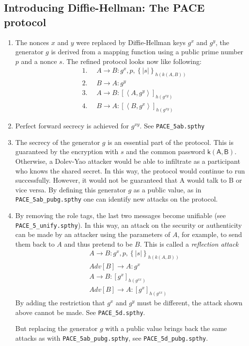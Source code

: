 \documentclass[a4paper,11pt]{scrartcl}
\newcommand{\tuple}[1]{\left\langle #1\right\rangle}
\begin{document}
\subsection{Introducing Diffie-Hellman: The PACE protocol}
\begin{enumerate}[label=\alph*)]
	\item The nonces $x$ and $y$ were replaced by Diffie-Hellman keys $g^x$ and $g^y$, the generator $g$ is derived from a mapping function using a public prime number $p$ and a nonce $s$.
The refined protocol looks now like following:
	  \begin{align*}
    		&\text{1. }\quad A \rightarrow B: g^x, p, \left\lbrace | s | \right\rbrace_{h(k(A,  B))}\\
		&\text{2. }\quad B \rightarrow A: g^y\\
		&\text{3. }\quad A \rightarrow B: [\tuple{A,  g^y}]_{h(g^{xy})}\\
		&\text{4. }\quad B \rightarrow A: [\tuple{B,  g^x}]_{h(g^{xy})}
  	\end{align*}
	\item Perfect forward secrecy is achieved for $g^{xy}$.  \newline
	See \texttt{PACE\_5ab.spthy}
	\item The secrecy of the generator $g$ is an essential part of the protocol. This is guaranteed by the encryption with $s$ and the common password $\mathsf{k(A,B)}$.  Otherwise, a Dolev-Yao attacker would be able to infiltrate as a participant who knows the shared secret.  In this way, the protocol would continue to run successfully. However, it would not be guaranteed that A would talk to B or vice versa.  By defining this generator $g$ as a public value, as in \texttt{PACE\_5ab\_pubg.spthy} one can identify new attacks on the protocol.
	\item By removing the role tags, the last two messages become unifiable (see \texttt{PACE\_5\_unify.spthy}).  In this way,  an attack on the security or authenticity can be made by an attacker using the parameters of $A$,  for example, to send them back to $A$ and thus pretend to be $B$. This is called a \emph{reflection attack}
	\begin{align*}
    		&A \rightarrow B: g^x, p, \left\lbrace | s | \right\rbrace_{h(k(A,  B))}\\
		&Adv[B] \rightarrow A: g^x\\
		&A \rightarrow B: [g^x]_{h(g^{xx})}\\
		&Adv[B] \rightarrow A: [g^x]_{h(g^{xx})}
  	\end{align*}
	By adding the restriction that $g^x$ and $g^y$ must be different,  the attack shown above cannot be made. \newline
See \texttt{PACE\_5d.spthy}.

But replacing the generator $g$ with a public value brings back the same attacks as with \texttt{PACE\_5ab_pubg.spthy},  see \texttt{PACE\_5d_pubg.spthy}.
\end{enumerate}
\newpage
\end{document}

